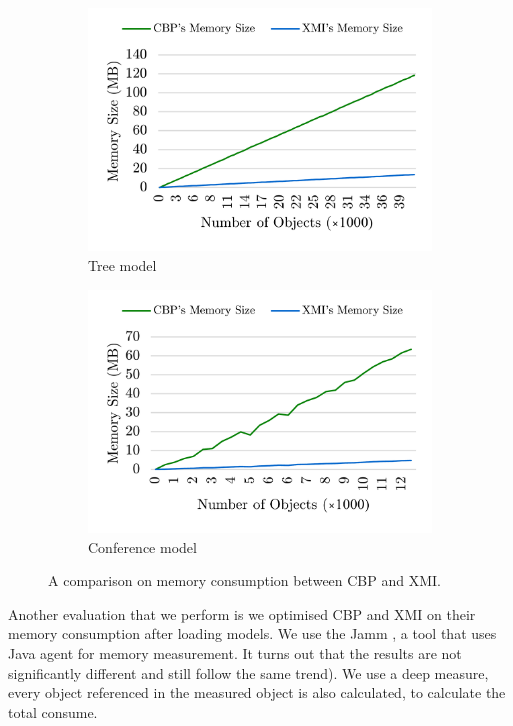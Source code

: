 \documentclass{llncs}
\begin{document}
\begin{figure}	
	\begin{subfigure}[t]{0.5\linewidth}
		\includegraphics[width=\linewidth]{memory_use_tree}
		\caption{Tree model}\label{fig:append_speed_tree}		
	\end{subfigure}
	\hfill
	\begin{subfigure}[t]{0.5\linewidth}
		\includegraphics[width=\linewidth]{memory_use_conf}
		\caption{Conference model}\label{fig:append_speed_conference}
	\end{subfigure}
	\caption{A comparison on memory consumption between CBP and XMI.}
	\label{fig:memory_use}
\end{figure}

Another evaluation that we perform is we optimised CBP and XMI on their memory consumption after loading models. We use the Jamm \cite{brosius2017jamm}, a tool that uses Java agent for memory measurement. It turns out that the results are not significantly different and still follow the same trend). We use a deep measure, every object referenced in the measured object is also calculated, to calculate the total consume. 
\end{document}

